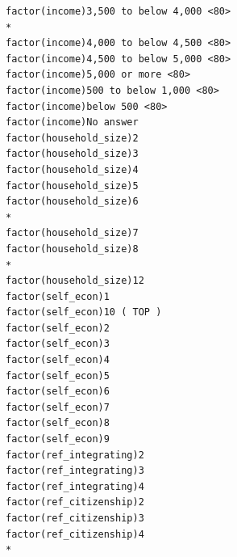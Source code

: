 \documentclass[
]{article}
\begin{document}
\begin{table}
\begin{minipage}[t]{\linewidth}
{\begin{verbatim}
factor(income)3,500 to below 4,000 <80>                                           *  
factor(income)4,000 to below 4,500 <80>                                              
factor(income)4,500 to below 5,000 <80>                                              
factor(income)5,000 or more <80>                                                     
factor(income)500 to below 1,000 <80>                                                
factor(income)below 500 <80>                                                         
factor(income)No answer                                                              
factor(household_size)2                                                              
factor(household_size)3                                                              
factor(household_size)4                                                              
factor(household_size)5                                                              
factor(household_size)6                                                           *  
factor(household_size)7                                                              
factor(household_size)8                                                           *  
factor(household_size)12                                                             
factor(self_econ)1                                                                   
factor(self_econ)10 ( TOP )                                                          
factor(self_econ)2                                                                   
factor(self_econ)3                                                                   
factor(self_econ)4                                                                   
factor(self_econ)5                                                                   
factor(self_econ)6                                                                   
factor(self_econ)7                                                                   
factor(self_econ)8                                                                   
factor(self_econ)9                                                                   
factor(ref_integrating)2                                                             
factor(ref_integrating)3                                                             
factor(ref_integrating)4                                                             
factor(ref_citizenship)2                                                             
factor(ref_citizenship)3                                                             
factor(ref_citizenship)4                                                          *  

\end{verbatim}}
\end{minipage}
\end{table}
\end{document}
